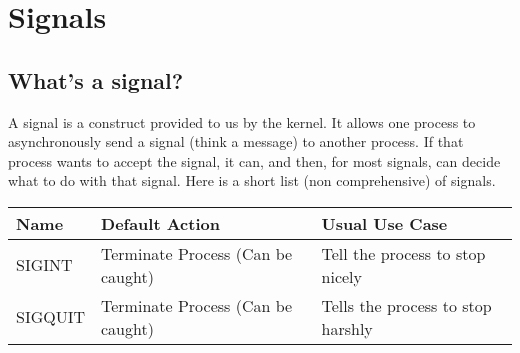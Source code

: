 \section{Signals}\label{signals}

\subsection{What's a signal?}\label{whats-a-signal}

A signal is a construct provided to us by the kernel. It allows one
process to asynchronously send a signal (think a message) to another
process. If that process wants to accept the signal, it can, and then,
for most signals, can decide what to do with that signal. Here is a
short list (non comprehensive) of signals.

\begin{longtable}[c]{@{}lll@{}}
\toprule
\begin{minipage}[b]{0.12\columnwidth}\raggedright\strut
Name
\strut\end{minipage} &
\begin{minipage}[b]{0.44\columnwidth}\raggedright\strut
Default Action
\strut\end{minipage} &
\begin{minipage}[b]{0.35\columnwidth}\raggedright\strut
Usual Use Case
\strut\end{minipage}\tabularnewline
\midrule
\endhead
\begin{minipage}[t]{0.12\columnwidth}\raggedright\strut
SIGINT
\strut\end{minipage} &
\begin{minipage}[t]{0.44\columnwidth}\raggedright\strut
Terminate Process (Can be caught)
\strut\end{minipage} &
\begin{minipage}[t]{0.35\columnwidth}\raggedright\strut
Tell the process to stop nicely
\strut\end{minipage}\tabularnewline
\begin{minipage}[t]{0.12\columnwidth}\raggedright\strut
SIGQUIT
\strut\end{minipage} &
\begin{minipage}[t]{0.44\columnwidth}\raggedright\strut
Terminate Process (Can be caught)
\strut\end{minipage} &
\begin{minipage}[t]{0.35\columnwidth}\raggedright\strut
Tells the process to stop harshly
\strut\end{minipage}\tabularnewline

\end{longtable}
